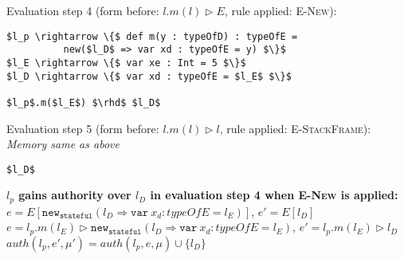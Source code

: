 \documentclass{llncs}
\newcommand{\keywadj}[1]{\mathtt{#1}}
\newcommand{\keyw}[1]{\keywadj{#1}~}
\begin{document}
\vspace{12pt}
\noindent Evaluation step 4 (form before: $l.m(l) \rhd E$, rule applied: \textsc{E-New}):
\vspace{-6pt}
\begin{lstlisting}[xleftmargin=20pt]
$l_p \rightarrow \{$ def m(y : typeOfD) : typeOfE =
          new($l_D$ => var xd : typeOfE = y) $\}$
$l_E \rightarrow \{$ var xe : Int = 5 $\}$
$l_D \rightarrow \{$ var xd : typeOfE = $l_E$ $\}$

$l_p$.m($l_E$) $\rhd$ $l_D$
\end{lstlisting}

\vspace{12pt}
\noindent Evaluation step 5 (form before: $l.m(l) \rhd l$, rule applied: \textsc{E-StackFrame}):\\
\vspace{-6pt}
\indent\textit{Memory same as above}\\
\vspace{-6pt}
\begin{lstlisting}[xleftmargin=20pt]
$l_D$
\end{lstlisting}

\newpage

\noindent\textbf{$l_p$ gains authority over $l_D$ in evaluation step 4 when \textsc{E-New} is applied:}\\

\noindent$e = E[\keywadj{new}_{\keywadj{stateful}}(l_D \Rightarrow \keyw{var} x_d : typeOfE = l_E)]$, $e' = E[l_D]$\\

\noindent$e = l_p.m(l_E) \rhd \keywadj{new}_{\keywadj{stateful}}(l_D \Rightarrow \keyw{var} x_d : typeOfE = l_E)$, $e' = l_p.m(l_E) \rhd l_D$\\

\noindent$auth(l_p, e', \mu') = auth(l_p, e, \mu) \cup \{ l_D \}$
\end{document}
